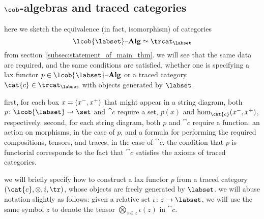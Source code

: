 \documentclass[11pt,oneside,article]{memoir}
\begin{document}
\subsection{$\cob$-algebras and traced categories}\label{subsec:cobalg_and_trcat}

here we sketch the equivalence (in fact, isomorphism) of categories
\begin{equation*}
   \lcob{\labset}\alg\equiv\trcat_{\labset}
\end{equation*}
from section~\ref{subsec:statement_of_main_thm}. we will see that the same data are required, and
the same conditions are satisfied, whether one is specifying a lax functor $p\in\lcob{\labset}\alg$
or a traced category $\cat{c}\in\trcat_{\labset}$ with objects generated by $\labset$.

first, for each box $x=(x^-,x^+)$ that might appear in a string diagram, both
$p\colon\lcob{\labset}\to\set$ and $\cat{c}$ require a set, $p(x)$ and
$\hom_{\cat{c}}(\inp{x},\outp{x})$, respectively. second, for each string diagram, both $p$ and
$\cat{c}$ require a function: an action on morphisms, in the case of $p$, and a formula for
performing the required compositions, tensors, and traces, in the case of $\cat{c}$. the condition
that $p$ is functorial corresponds to the fact that $\cat{c}$ satisfies the axioms of traced
categories.

we will briefly specify how to construct a lax functor $p$ from a traced category
$(\cat{c},\otimes,i,\tr)$, whose objects are freely generated by $\labset$. we will abuse notation
slightly as follows: given a relative set $\iota\colon z\to\labset$, we will use the same symbol $z$
to denote the tensor $\bigotimes_{z\in z}\iota(z)$ in $\cat{c}$.
\end{document}
